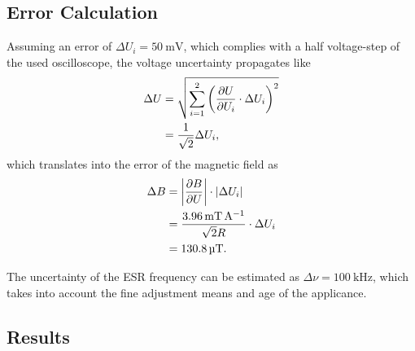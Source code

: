 \subsection{Error Calculation}
Assuming an error of $\Delta U_i=\SI{50}{\mV}$, which complies with a half voltage-step of the used oscilloscope, the voltage uncertainty propagates like
\begin{alignat*}{2}
	\Delta U &= \sqrt{\sum^2_{i=1}\left(\frac{\partial U}{\partial U_i}\cdot \Delta U_i\right)^2} \\
	&=\frac{1}{\sqrt{2}}\Delta U_i,
\end{alignat*}
which translates into the error of the magnetic field as
\begin{alignat*}{2}
	\Delta B &= \left| \frac{\partial B}{\partial U} \right|\cdot \left| \Delta U_i \right| \\
	&= \frac{\SI{3.96}{\milli\tesla\per\ampere}}{\sqrt{2}R}\cdot\Delta U_i \\
	&= \SI{130.8}{\micro\tesla}.
\end{alignat*}

The uncertainty of the ESR frequency can be estimated as $\Delta\nu = \SI{100}{\kHz}$, which takes into account the fine adjustment means and age of the applicance.

\subsection{Results}

